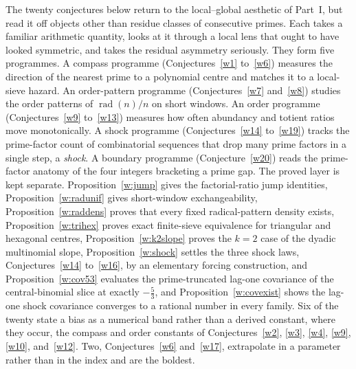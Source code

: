 \documentclass[11pt]{article}
\theoremstyle{definition}
\begin{document}
The twenty conjectures below return to the local--global aesthetic of Part~I, but read it off objects other than residue classes of consecutive primes.  Each takes a familiar arithmetic quantity, looks at it through a local lens that ought to have looked symmetric, and takes the residual asymmetry seriously.  They form five programmes.  A compass programme (Conjectures~\ref{w1} to~\ref{w6}) measures the direction of the nearest prime to a polynomial centre and matches it to a local-sieve hazard.  An order-pattern programme (Conjectures~\ref{w7} and~\ref{w8}) studies the order patterns of $\operatorname{rad}(n)/n$ on short windows.  An order programme (Conjectures~\ref{w9} to~\ref{w13}) measures how often abundancy and totient ratios move monotonically.  A shock programme (Conjectures~\ref{w14} to~\ref{w19}) tracks the prime-factor count of combinatorial sequences that drop many prime factors in a single step, a \emph{shock}.  A boundary programme (Conjecture~\ref{w20}) reads the prime-factor anatomy of the four integers bracketing a prime gap.  The proved layer is kept separate.  Proposition~\ref{w:jump} gives the factorial-ratio jump identities, Proposition~\ref{w:radunif} gives short-window exchangeability, Proposition~\ref{w:raddens} proves that every fixed radical-pattern density exists, Proposition~\ref{w:trihex} proves exact finite-sieve equivalence for triangular and hexagonal centres, Proposition~\ref{w:k2slope} proves the $k=2$ case of the dyadic multinomial slope, Proposition~\ref{w:shock} settles the three shock laws, Conjectures~\ref{w14} to~\ref{w16}, by an elementary forcing construction, and Proposition~\ref{w:cov53} evaluates the prime-truncated lag-one covariance of the central-binomial slice at exactly $-\tfrac53$, and Proposition~\ref{w:covexist} shows the lag-one shock covariance converges to a rational number in every family.  Six of the twenty state a bias as a numerical band rather than a derived constant, where they occur, the compass and order constants of Conjectures~\ref{w2}, \ref{w3}, \ref{w4}, \ref{w9}, \ref{w10}, and~\ref{w12}.  Two, Conjectures~\ref{w6} and~\ref{w17}, extrapolate in a parameter rather than in the index and are the boldest.
\end{document}

